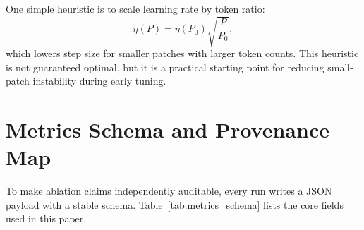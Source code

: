 \documentclass[conference]{IEEEtran}
\begin{document}
One simple heuristic is to scale learning rate by token ratio:
\begin{equation}
\eta(P) = \eta(P_0)\sqrt{\frac{P}{P_0}},
\label{eq:lr_scale}
\end{equation}
which lowers step size for smaller patches with larger token counts. This heuristic is not guaranteed optimal, but it is a practical starting point for reducing small-patch instability during early tuning.

\section{Metrics Schema and Provenance Map}
To make ablation claims independently auditable, every run writes a JSON payload with a stable schema. Table~\ref{tab:metrics_schema} lists the core fields used in this paper.
\end{document}

